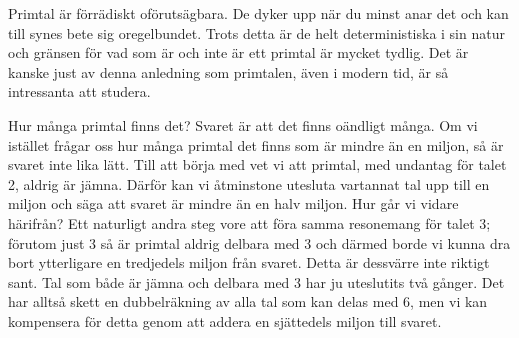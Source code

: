 
Primtal är förrädiskt oförutsägbara.
De dyker upp när du minst anar det och kan till synes bete sig oregelbundet.
Trots detta är de helt deterministiska i sin natur och gränsen för vad som är och inte är ett primtal är mycket tydlig.
Det är kanske just av denna anledning som primtalen, även i modern tid, är så intressanta att studera.


Hur många primtal finns det? Svaret är att det finns oändligt många.
Om vi istället frågar oss hur många primtal det finns som är mindre än en miljon, så är svaret inte lika lätt.
Till att börja med vet vi att primtal, med undantag för talet 2, aldrig är jämna.
Därför kan vi åtminstone utesluta vartannat tal upp till en miljon och säga att svaret är mindre än en halv miljon.
Hur går vi vidare härifrån?
Ett naturligt andra steg vore att föra samma resonemang för talet 3;
förutom just 3 så är primtal aldrig delbara med 3 och därmed borde vi kunna dra bort ytterligare en tredjedels miljon från svaret.
Detta är dessvärre inte riktigt sant.
Tal som både är jämna och delbara med 3 har ju uteslutits två gånger.
Det har alltså skett en dubbelräkning av alla tal som kan delas med 6,
men vi kan kompensera för detta genom att addera en sjättedels miljon till svaret.


